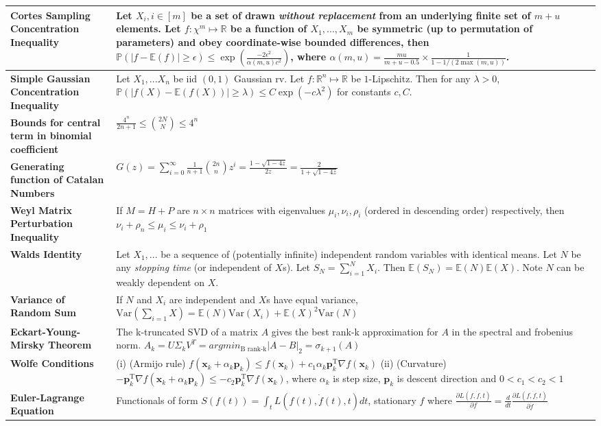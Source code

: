 \documentclass[11pt]{article}
\begin{document}
\begin{longtable}{|>{\raggedright}m{4.5cm}|m{13cm}|}
\textbf{Cortes Sampling Concentration Inequality} & Let $X_i, i \in [m]$ be a set of drawn \textit{without replacement} from an underlying finite set of $m+u$ elements. Let $f: \chi^m \mapsto \mathbb{R}$ be a function of $X_1,...,X_m$ be symmetric (up to permutation of parameters) and obey coordinate-wise bounded differences, then $\mathbb{P}(|f - \mathbb{E}(f)| \geq \epsilon) \leq \exp\left(  \frac{-2\epsilon^2}{\alpha(m,u)c^2} \right)$, where $\alpha(m,u)=\frac{mu}{m+u-0.5} \times \frac{1}{1-1/(2\max(m,u))}$.\\ \hline
\textbf{Simple Gaussian Concentration Inequality} & Let $X_1,...X_n$ be iid $(0,1)$ Gaussian rv. Let $f:\mathbb{R}^n \mapsto \mathbb{R}$ be $1$-Lipschitz. Then for any $\lambda >0$, $\mathbb{P}(|f(X) - \mathbb{E}(f(X))| \geq \lambda) \leq C\exp(-c\lambda^2)$ for constants $c, C$.\\ \hline
\textbf{Bounds for central term in binomial coefficient} & $\frac{4^n}{2n+1} \leq \binom{2N}{N} \leq 4^n$\\ \hline
\textbf{Generating function of Catalan Numbers} & $G(z) = \sum_{i=0}^{\infty} \frac{1}{n+1} \binom{2n}{n} z^i = \frac{1-\sqrt{1-4z}}{2z} = \frac{2}{1+\sqrt{1-4z}}$\\ \hline
\textbf{Weyl Matrix Perturbation Inequality} & If $M=H+P$ are $n \times n$ matrices with eigenvalues $\mu_i, \nu_i, \rho_i$ (ordered in descending order) respectively, then $\nu_i + \rho_n \leq \mu_i \leq \nu_i + \rho_1$\\ \hline
\textbf{Walds Identity} & Let $X_1,...$ be a sequence of (potentially infinite) independent random variables with identical means. Let $N$ be any \textit{stopping time} (or independent of $X$s). Let $S_N=\sum_{i=1}^{N}X_i$. Then $\mathbb{E}(S_N)=\mathbb{E}(N)\mathbb{E}(X)$. Note $N$ can be weakly dependent on $X$.\\ \hline
\textbf{Variance of Random Sum} & If $N$ and $X_i$ are independent and $X$s have equal variance, $\text{Var}(\sum_{i=1}{X}) = \mathbb{E}(N)\text{Var}(X_i) + \mathbb{E}(X)^2\text{Var}(N)$\\ \hline
\textbf{Eckart-Young-Mirsky Theorem} & The k-truncated SVD of a matrix $A$ gives the best rank-k approximation for $A$ in the spectral and frobenius norm. $A_k = U\Sigma_k V^T = argmin_{\text{B rank-k}}|A-B|_2 = \sigma_{k+1}(A)$\\ \hline
\textbf{Wolfe Conditions} & (i) (Armijo rule) $ f(\mathbf{x}_k+\alpha_k\mathbf{p}_k)\leq f(\mathbf{x}_k)+c_1\alpha_k\mathbf{p}_k^{\mathrm T}\nabla f(\mathbf{x}_k) $ (ii) (Curvature) $-\mathbf{p}_k^{\mathrm T}\nabla f(\mathbf{x}_k+\alpha_k\mathbf{p}_k) \leq -c_2\mathbf{p}_k^{\mathrm T}\nabla f(\mathbf{x}_k)$, where $\alpha_k$ is step size, $\mathbf{p}_k$ is descent direction and $ 0 < c_1 < c_2 < 1 $\\ \hline
\textbf{Euler-Lagrange Equation} & Functionals of form $S(f(t)) = \int_t L\left( f(t), \dot{f}(t), t \right) dt$, stationary $f$ where $\frac{\partial L(f, \dot{f}, t)}{\partial f} = \frac{d}{dt} \frac{\partial L(f, \dot{f}, t)}{\partial \dot{f}}$\\ \hline
\end{longtable}
\end{document}

